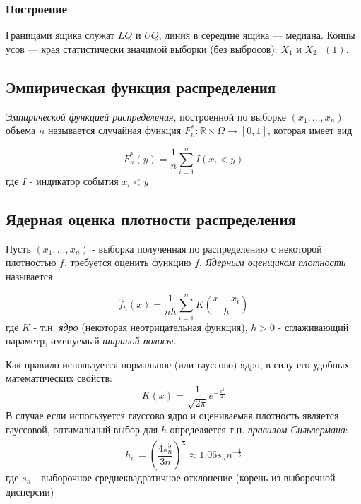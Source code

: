 \documentclass[12pt,a4paper]{article}
\begin{document}
\subsubsection{Построение}
Границами ящика служат $LQ \text{ и } UQ$, линия в середине ящика — медиана. Концы усов — края статистически значимой выборки (без выбросов): $X_1 \text{ и } X_2 \text{ }\hyperref[1]{(1)}$.

\subsection{Эмпирическая функция распределения}
\textit{Эмпирической функцией распределения}, построенной по выборке $(x_1, ..., x_n)$ объема $n$ называется случайная функция $F_n^*: \mathbb{R} \times \Omega \to [0,1]$, которая имеет вид

\begin{equation}
F_n^*(y) = \frac{1}{n}\sum_{i=1}^n{I(x_i < y)}
\end{equation}
где $I$ - индикатор события $x_i < y$\cite{chernova}

\subsection{Ядерная оценка плотности распределения}
Пусть $(x_1, ..., x_n)$ - выборка полученная по распределению с некоторой плотностью $f$, требуется оценить функцию $f$. \textit{Ядерным оценщиком плотности} называется\cite{kde}

\begin{equation}
\hat{f}_h(x) = \frac{1}{nh}\sum_{i=1}^{n}{K\left(\frac{x-x_i}{h}\right)}
\end{equation}
где $K$ - т.н. \textit{ядро} (некоторая неотрицательная функция), $h>0$ - сглаживающий параметр, именуемый \textit{шириной полосы}.
\newline

Как правило используется нормальное (или гауссово) ядро, в силу его удобных математических свойств:
\begin{equation}
K(x) = \frac{1}{\sqrt{2\pi}}e^{-\frac{x^2}{2}}
\end{equation}
\newline
\label{silverman}
В случае если используется гауссово ядро и оцениваемая плотность является гауссовой, оптимальный выбор для $h$ определяется т.н. \textit{правилом Сильвермана}\cite{kde}:
\begin{equation}
h_n = \left(\frac{4s_n^5}{3n}\right)^{\frac{1}{5}}\approx 1.06s_n n^{-\frac{1}{5}}
\end{equation}
где $s_n$ - выборочное среднеквадратичное отклонение (корень из выборочной дисперсии)
\end{document}

